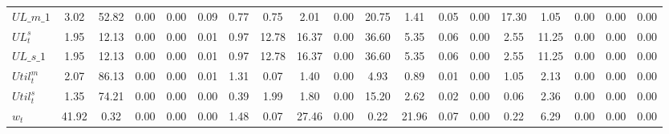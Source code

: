 \begin{center}
\begin{longtable}{lcccccccccccccccccc}
$UL\_m\_1           $	 & 	             3.02	 & 	            52.82	 & 	             0.00	 & 	             0.00	 & 	             0.09	 & 	             0.77	 & 	             0.75	 & 	             2.01	 & 	             0.00	 & 	            20.75	 & 	             1.41	 & 	             0.05	 & 	             0.00	 & 	            17.30	 & 	             1.05	 & 	             0.00	 & 	             0.00	 & 	             0.00 \\ 
$  UL^s_t           $	 & 	             1.95	 & 	            12.13	 & 	             0.00	 & 	             0.00	 & 	             0.01	 & 	             0.97	 & 	            12.78	 & 	            16.37	 & 	             0.00	 & 	            36.60	 & 	             5.35	 & 	             0.06	 & 	             0.00	 & 	             2.55	 & 	            11.25	 & 	             0.00	 & 	             0.00	 & 	             0.00 \\ 
$UL\_s\_1           $	 & 	             1.95	 & 	            12.13	 & 	             0.00	 & 	             0.00	 & 	             0.01	 & 	             0.97	 & 	            12.78	 & 	            16.37	 & 	             0.00	 & 	            36.60	 & 	             5.35	 & 	             0.06	 & 	             0.00	 & 	             2.55	 & 	            11.25	 & 	             0.00	 & 	             0.00	 & 	             0.00 \\ 
$ Util^m_t          $	 & 	             2.07	 & 	            86.13	 & 	             0.00	 & 	             0.00	 & 	             0.01	 & 	             1.31	 & 	             0.07	 & 	             1.40	 & 	             0.00	 & 	             4.93	 & 	             0.89	 & 	             0.01	 & 	             0.00	 & 	             1.05	 & 	             2.13	 & 	             0.00	 & 	             0.00	 & 	             0.00 \\ 
$  Util^s_t         $	 & 	             1.35	 & 	            74.21	 & 	             0.00	 & 	             0.00	 & 	             0.00	 & 	             0.39	 & 	             1.99	 & 	             1.80	 & 	             0.00	 & 	            15.20	 & 	             2.62	 & 	             0.02	 & 	             0.00	 & 	             0.06	 & 	             2.36	 & 	             0.00	 & 	             0.00	 & 	             0.00 \\ 
$ w_t               $	 & 	            41.92	 & 	             0.32	 & 	             0.00	 & 	             0.00	 & 	             0.00	 & 	             1.48	 & 	             0.07	 & 	            27.46	 & 	             0.00	 & 	             0.22	 & 	            21.96	 & 	             0.07	 & 	             0.00	 & 	             0.22	 & 	             6.29	 & 	             0.00	 & 	             0.00	 & 	             0.00 \\ 

\end{longtable}
\end{center}
